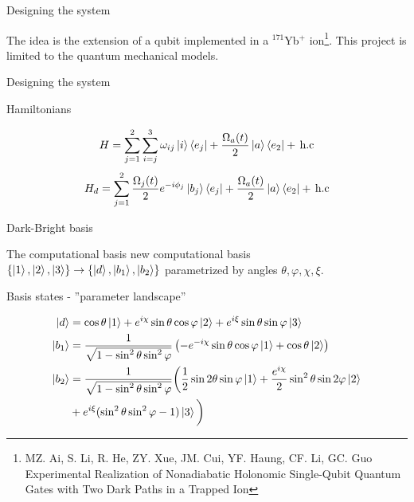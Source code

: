 \documentclass[t]{beamer}
\begin{document}
\begin{frame}{Designing the system}

The idea is the extension of a qubit implemented in a $^{171}$Yb$^{+}$ ion\footnote{\scriptsize MZ. Ai, S. Li, R. He, ZY. Xue, JM. Cui, YF. Haung, CF. Li, GC. Guo Experimental Realization of Nonadiabatic Holonomic
Single-Qubit Quantum Gates with Two Dark Paths in a
Trapped Ion}.
This project is limited to the quantum mechanical models.

\end{frame}


\begin{frame}{Designing the system}



\begin{block}{Hamiltonians}

\begin{equation}
H = \sum_{j = 1}^2 \sum_{i =j}^{3} \omega_{ij}\ket{i}\bra{e_j}  + \frac{\Omega_{a}(t)}{2}\ket{a}\bra{e_2}  +\,\text{h.c} 
\end{equation}
\begin{equation}
 H_d = \sum_{j = 1}^2 \frac{\Omega_j(t)}{2}e^{-i\phi_j}\ket{b_j}\bra{e_j}  + \frac{\Omega_a(t)}{2}\ket{a}\bra{e_2}  +\,\text{h.c}
\end{equation}

\end{block}

\end{frame}

\begin{frame}{Dark-Bright basis}

\begin{block}


The computational basis new computational basis $\{\ket{1},\ket{2},\ket{3}\} \rightarrow \{\ket{d},\ket{b_1},\ket{b_2}\}$ 
parametrized by angles $\theta,\varphi,\chi,\xi$.


\end{block}

\begin{block}{Basis states - ''parameter landscape''}

\begin{equation}
\begin{aligned}
\ket{d} &= \cos\theta\ket{1} + e^{i\chi}\sin\theta\cos\varphi\ket{2} + e^{i\xi}\sin\theta\sin\varphi\ket{3}
\\
\ket{b_1} &= \frac{1}{\sqrt{1-\sin^2\theta\sin^2\varphi}} \left(-e^{-i\chi}\sin\theta\cos\varphi\ket{1} + \cos\theta\ket{2} \right)
\\
\ket{b_2} &= \frac{1}{\sqrt{1-\sin^2\theta\sin^2\varphi}} \bigg(\frac{1}{2}\sin 2\theta\sin\varphi\ket{1} + \dfrac{e^{i\chi}}{2}\sin^2\theta\sin 2\varphi\ket{2} \\&+ e^{i\xi}(\sin^2\theta\sin^2\varphi - 1)\ket{3}\bigg)
\end{aligned}
\end{equation}

\end{block}
\end{frame}
\end{document}
